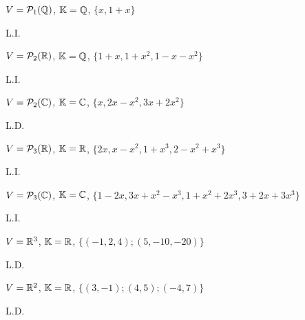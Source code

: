 \documentclass[12pt]{exam}
\begin{document}
    \begin{exercicio}
        $V = \mathcal{P}_1(\mathbb{Q})$, $\mathbb{K} = \mathbb{Q}$, $\{x, 1 + x\}$
        \begin{solucao}
            L.I.
        \end{solucao}
    \end{exercicio}

    \begin{exercicio}
        $V = \mathcal{P}_2(\mathbb{R})$, $\mathbb{K} = \mathbb{Q}$, $\{1 + x, 1 + x^2, 1 - x - x^2\}$
        \begin{solucao}
            L.I.
        \end{solucao}
    \end{exercicio}

    \begin{exercicio}
        $V = \mathcal{P}_2(\mathbb{C})$, $\mathbb{K} = \mathbb{C}$, $\{x, 2x - x^2, 3x + 2x^2\}$
        \begin{solucao}
            L.D.
        \end{solucao}
    \end{exercicio}

    \begin{exercicio}
        $V = \mathcal{P}_3(\mathbb{R})$, $\mathbb{K} = \mathbb{R}$, $\{2x, x - x^2, 1 + x^3, 2 - x^2 + x^3\}$
        \begin{solucao}
            L.I.
        \end{solucao}
    \end{exercicio}
    
    \begin{exercicio}
        $V = \mathcal{P}_3(\mathbb{C})$, $\mathbb{K} = \mathbb{C}$, $\{1 - 2x, 3x + x^2 - x^3, 1 + x^2 + 2x^3, 3 + 2x + 3x^3\}$
        \begin{solucao}
            L.I.
        \end{solucao}
    \end{exercicio}

    \begin{exercicio}
        $V = \mathbb{R}^3$, $\mathbb{K} = \mathbb{R}$, $\{(-1, 2, 4); (5, -10, -20)\}$
        \begin{solucao}
            L.D.
        \end{solucao}
    \end{exercicio}
    
    \begin{exercicio}
        $V = \mathbb{R}^2$, $\mathbb{K} = \mathbb{R}$, $\{(3, -1); (4, 5); (-4, 7)\}$
        \begin{solucao}
            L.D.
        \end{solucao}
    \end{exercicio}
\end{document}
